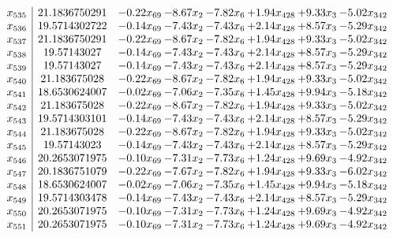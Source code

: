 \documentclass[8pt]{article}
\begin{document}
\[\begin{array}{c| c c@{\hskip 2pt} c@{\hskip 2pt} c@{\hskip 2pt} c@{\hskip 2pt} c@{\hskip 2pt} c@{\hskip 2pt} }
 x_{535}   &  21.1836750291 & -0.22 x_{69} & -8.67 x_{2} & -7.82 x_{6} & +  1.94 x_{428} & +  9.33 x_{3} & -5.02 x_{342}\\
 x_{536}   &  19.5714302722 & -0.14 x_{69} & -7.43 x_{2} & -7.43 x_{6} & +  2.14 x_{428} & +  8.57 x_{3} & -5.29 x_{342}\\
 x_{537}   &  21.1836750291 & -0.22 x_{69} & -8.67 x_{2} & -7.82 x_{6} & +  1.94 x_{428} & +  9.33 x_{3} & -5.02 x_{342}\\
 x_{538}   &  19.57143027 & -0.14 x_{69} & -7.43 x_{2} & -7.43 x_{6} & +  2.14 x_{428} & +  8.57 x_{3} & -5.29 x_{342}\\
 x_{539}   &  19.57143027 & -0.14 x_{69} & -7.43 x_{2} & -7.43 x_{6} & +  2.14 x_{428} & +  8.57 x_{3} & -5.29 x_{342}\\
 x_{540}   &  21.183675028 & -0.22 x_{69} & -8.67 x_{2} & -7.82 x_{6} & +  1.94 x_{428} & +  9.33 x_{3} & -5.02 x_{342}\\
 x_{541}   &  18.6530624007 & -0.02 x_{69} & -7.06 x_{2} & -7.35 x_{6} & +  1.45 x_{428} & +  9.94 x_{3} & -5.18 x_{342}\\
 x_{542}   &  21.183675028 & -0.22 x_{69} & -8.67 x_{2} & -7.82 x_{6} & +  1.94 x_{428} & +  9.33 x_{3} & -5.02 x_{342}\\
 x_{543}   &  19.5714303101 & -0.14 x_{69} & -7.43 x_{2} & -7.43 x_{6} & +  2.14 x_{428} & +  8.57 x_{3} & -5.29 x_{342}\\
 x_{544}   &  21.183675028 & -0.22 x_{69} & -8.67 x_{2} & -7.82 x_{6} & +  1.94 x_{428} & +  9.33 x_{3} & -5.02 x_{342}\\
 x_{545}   &  19.57143023 & -0.14 x_{69} & -7.43 x_{2} & -7.43 x_{6} & +  2.14 x_{428} & +  8.57 x_{3} & -5.29 x_{342}\\
 x_{546}   &  20.2653071975 & -0.10 x_{69} & -7.31 x_{2} & -7.73 x_{6} & +  1.24 x_{428} & +  9.69 x_{3} & -4.92 x_{342}\\
 x_{547}   &  20.1836751079 & -0.22 x_{69} & -7.67 x_{2} & -7.82 x_{6} & +  1.94 x_{428} & +  9.33 x_{3} & -6.02 x_{342}\\
 x_{548}   &  18.6530624007 & -0.02 x_{69} & -7.06 x_{2} & -7.35 x_{6} & +  1.45 x_{428} & +  9.94 x_{3} & -5.18 x_{342}\\
 x_{549}   &  19.5714303478 & -0.14 x_{69} & -7.43 x_{2} & -7.43 x_{6} & +  2.14 x_{428} & +  8.57 x_{3} & -5.29 x_{342}\\
 x_{550}   &  20.2653071975 & -0.10 x_{69} & -7.31 x_{2} & -7.73 x_{6} & +  1.24 x_{428} & +  9.69 x_{3} & -4.92 x_{342}\\
 x_{551}   &  20.2653071975 & -0.10 x_{69} & -7.31 x_{2} & -7.73 x_{6} & +  1.24 x_{428} & +  9.69 x_{3} & -4.92 x_{342}\\

\end{array}\]
\end{document}
